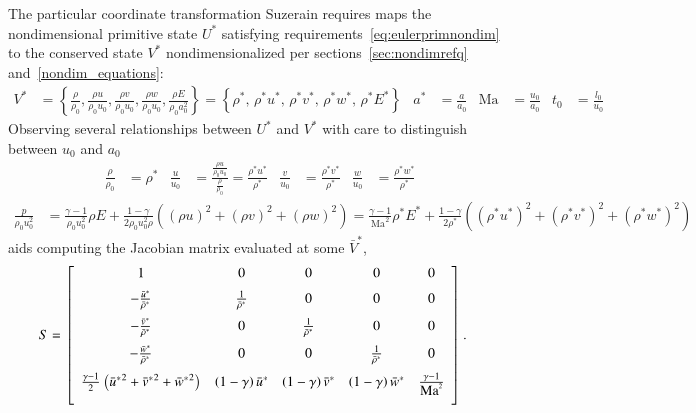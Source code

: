 \documentclass[letterpaper,11pt,nointlimits,reqno,draft]{amsbook}
\newcommand{\Mach}[1][]{\ensuremath{\mbox{Ma}_{#1}}}
\begin{document}
The particular coordinate transformation Suzerain requires maps the
nondimensional primitive state $U^*$ satisfying
requirements~\eqref{eq:eulerprimnondim} to the conserved state $V^*$
nondimensionalized per sections~\ref{sec:nondimrefq}
and~\ref{nondim_equations}:
\begin{align}
\label{eq:eulerconsnondim}
V^{*}
&= \left\{
  \frac{\rho}{\rho_0},
  \frac{\rho u}{\rho_0 u_0},
  \frac{\rho v}{\rho_0 u_0},
  \frac{\rho w}{\rho_0 u_0},
  \frac{\rho E}{\rho_0 a_0^2}
\right\}
= \left\{
    \rho^{*},
  \,\rho^{*} u^{*},
  \,\rho^{*} v^{*},
  \,\rho^{*} w^{*},
  \,\rho^{*} E^{*}
\right\}
&
a^{*} &= \frac{a}{a_0}
&
\Mach &= \frac{u_0}{a_0}
&
t_0 &= \frac{l_0}{u_0}
\end{align}
Observing several relationships between $U^*$ and $V^*$ with care to
distinguish between $u_0$ and $a_0$
\begin{align}
  \frac{\rho}{\rho_0} &= \rho^*
&
  \frac{u}{u_0} &=
  \frac{\frac{\rho{}u}{\rho_0u_0}}{\frac{\rho}{\rho_0}}
  =
  \frac{\rho^{*}u^{*}}{\rho^{*}}
&
  \frac{v}{u_0} &= \frac{\rho^{*}v^*}{\rho^*}
&
  \frac{w}{u_0} &= \frac{\rho^{*}w^*}{\rho^*}
\end{align}
\begin{align}
 \frac{p}{\rho_0 u_0^2}
&=
   \frac{\gamma-1}{\rho_0 u_0^2} \rho E
 + \frac{1-\gamma}{2 \rho_0 u_0^2 \rho}\left(
           \left(\rho{}u\right)^2
         + \left(\rho{}v\right)^2
         + \left(\rho{}w\right)^2
   \right)
=
   \frac{\gamma-1}{\Mach^2} \rho^{*} E^{*}
 + \frac{1-\gamma}{2 \rho^{*}}\left(
           \left(\rho^{*}u^{*}\right)^2
         + \left(\rho^{*}v^{*}\right)^2
         + \left(\rho^{*}w^{*}\right)^2
   \right)
\end{align}
aids computing the Jacobian matrix evaluated at some $\bar{V}^{*}$,
\begin{align}
S &= \left[\begin{array}{ccccc}
    1      %
  & 0      %
  & 0      %
  & 0      %
  & 0      %
  \\ \noalign{\medskip}
    - \frac{\bar{u}^*}{\bar{\rho}^*} %
  & \frac{1}{\bar{\rho}^*}           %
  & 0                                %
  & 0                                %
  & 0                                %
  \\ \noalign{\medskip}
    - \frac{\bar{v}^*}{\bar{\rho}^*} %
  & 0                                %
  & \frac{1}{\bar{\rho}^*}           %
  & 0                                %
  & 0                                %
  \\ \noalign{\medskip}
    - \frac{\bar{w}^*}{\bar{\rho}^*} %
  & 0                                %
  & 0                                %
  & \frac{1}{\bar{\rho}^*}           %
  & 0                                %
  \\ \noalign{\medskip}
    \frac{\gamma-1}{2}\left({\bar{u}^*}^2+{\bar{v}^*}^2+{\bar{w}^*}^2\right) %
  & \left(1 - \gamma\right) \bar{u}^*   %
  & \left(1 - \gamma\right) \bar{v}^*   %
  & \left(1 - \gamma\right) \bar{w}^*   %
  & \frac{\gamma-1}{\Mach^2}            %
  \\ \noalign{\medskip}
\end{array}\right]
.
\end{align}
\end{document}
